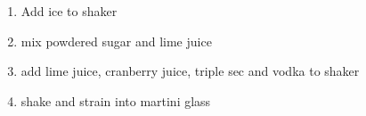 \documentclass[letter]{recipe}
\begin{document}

\begin{enumerate}
\addtolength{\itemindent}{2em}
 \item Add ice to shaker
%
 \item mix powdered sugar and lime juice
%
 \item add lime juice, cranberry juice, triple sec and vodka to shaker
%
 \item shake and strain into martini glass
\end{enumerate}
\end{document}
